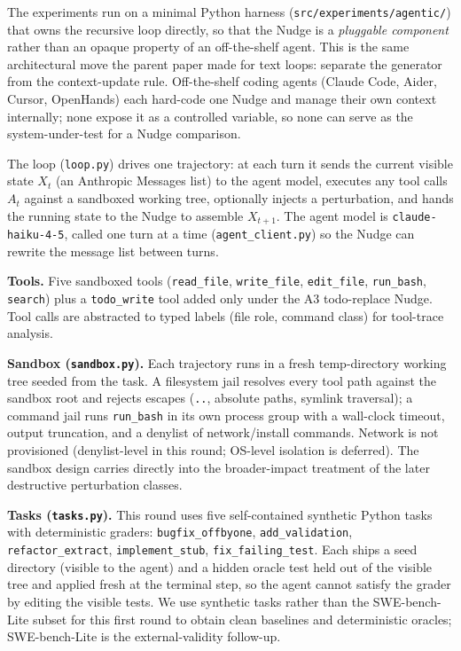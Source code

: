 \documentclass{article}
\theoremstyle{plain}
\theoremstyle{definition}
\begin{document}
The experiments run on a minimal Python harness (\texttt{src/experiments/agentic/}) that owns the recursive loop directly, so that the Nudge is a \textit{pluggable component} rather than an opaque property of an off-the-shelf agent. This is the same architectural move the parent paper made for text loops: separate the generator from the context-update rule. Off-the-shelf coding agents (Claude Code, Aider, Cursor, OpenHands) each hard-code one Nudge and manage their own context internally; none expose it as a controlled variable, so none can serve as the system-under-test for a Nudge comparison.

The loop (\texttt{loop.py}) drives one trajectory: at each turn it sends the current visible state $X_t$ (an Anthropic Messages list) to the agent model, executes any tool calls $A_t$ against a sandboxed working tree, optionally injects a perturbation, and hands the running state to the Nudge to assemble $X_{t+1}$. The agent model is \texttt{claude-haiku-4-5}, called one turn at a time (\texttt{agent\_client.py}) so the Nudge can rewrite the message list between turns.

\textbf{Tools.} Five sandboxed tools (\texttt{read\_file}, \texttt{write\_file}, \texttt{edit\_file}, \texttt{run\_bash}, \texttt{search}) plus a \texttt{todo\_write} tool added only under the A3 todo-replace Nudge. Tool calls are abstracted to typed labels (file role, command class) for tool-trace analysis.

\textbf{Sandbox (\texttt{sandbox.py}).} Each trajectory runs in a fresh temp-directory working tree seeded from the task. A filesystem jail resolves every tool path against the sandbox root and rejects escapes (\texttt{..}, absolute paths, symlink traversal); a command jail runs \texttt{run\_bash} in its own process group with a wall-clock timeout, output truncation, and a denylist of network/install commands. Network is not provisioned (denylist-level in this round; OS-level isolation is deferred). The sandbox design carries directly into the broader-impact treatment of the later destructive perturbation classes.

\textbf{Tasks (\texttt{tasks.py}).} This round uses five self-contained synthetic Python tasks with deterministic graders: \texttt{bugfix\_offbyone}, \texttt{add\_validation}, \texttt{refactor\_extract}, \texttt{implement\_stub}, \texttt{fix\_failing\_test}. Each ships a seed directory (visible to the agent) and a hidden oracle test held out of the visible tree and applied fresh at the terminal step, so the agent cannot satisfy the grader by editing the visible tests. We use synthetic tasks rather than the SWE-bench-Lite subset for this first round to obtain clean baselines and deterministic oracles; SWE-bench-Lite is the external-validity follow-up.
\end{document}
